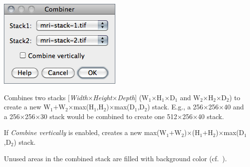 \begin{minipage}[c][1\totalheight][t]{0.335\columnwidth}%
\includegraphics[scale=0.55]{images/Combine}%
\end{minipage}%
\begin{minipage}[c][1\totalheight][t]{0.665\columnwidth}%
Combines two stacks {[}\emph{Width}$\times$\emph{Height}$\times$\emph{Depth}{]}
(W$_{1}$$\times$H$_{1}$$\times$D$_{1}$ and W$_{2}$$\times$H$_{2}$$\times$D$_{2}$)
to create a new W$_{1}$$+$W$_{2}$$\times$max(H$_{1}$,H$_{2}$)$\times$max(D$_{1}$,D$_{2}$)
stack. E.g., a 256$\times$256$\times$40 and a 256$\times$256$\times$30
stack would be combined to create one 512$\times$256$\times$40 stack.

\medskip{}
If \emph{Combine vertically} is enabled, creates a new max(W$_{1}$$+$W$_{2}$)$\times$(H$_{1}$$+$H$_{2}$)$\times$max(D$_{1}$,D$_{2}$)
stack.%
\end{minipage}

Unused areas in the combined stack are filled with background color
(cf.\ ).




\paragraph[\protect\userinterface{Concatenate\ldots{}}]{\protect{}\label{sub:Concatenate...}}

